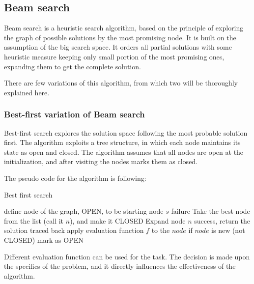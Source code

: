 \subsection{Beam search}

Beam search is a heuristic search algorithm, based on the principle of exploring the graph of possible solutions by the most promising node. It is built on the assumption of the big search space. It orders all partial solutions with some heuristic measure keeping only small portion of the most promising ones, expanding them to get the complete solution.

There are few variations of this algorithm, from which two will be thoroughly explained here.

\subsubsection{Best-first variation of Beam search}

Best-first search explores the solution space following the most probable solution first. The algorithm exploits a tree structure, in which each node maintains its state as open and closed. The algorithm assumes that all nodes are open at the initialization, and after visiting the nodes marks them as closed. 

The pseudo code for the algorithm is following:


\begin{algorithm}
	\caption{Best first search}
	\label{alg:protrack}
	\begin{algorithmic}[1]
		\State define node of the graph, OPEN, to be starting node $s$
		\State	failure
		\EndIf
		\State Take the best node from the list (call it $n$), and make it CLOSED
		\State Expand node $n$
			\State	success, return the solution traced back
		\EndIf
		\State	apply evaluation function $f$ to the $node$\;
		\State	if $node$ is new (not CLOSED) mark as OPEN\;
		\EndFor
	\end{algorithmic}
\end{algorithm}



\vspace{0.2 cm}

Different evaluation function can be used for the task. The decision is made upon the specifics of the problem, and it directly influences the effectiveness of the algorithm. 

